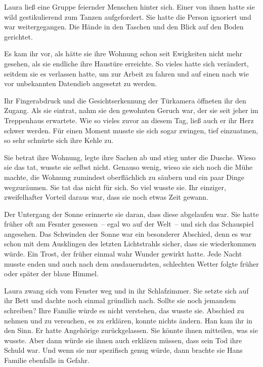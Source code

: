 Laura ließ eine Gruppe feiernder Menschen hinter sich. Einer von ihnen hatte sie wild gestikulierend zum Tanzen aufgefordert. Sie hatte die Person ignoriert und war weitergegangen. Die Hände in den Taschen und den Blick auf den Boden gerichtet.

\par

Es kam ihr vor, als hätte sie ihre Wohnung schon seit Ewigkeiten nicht mehr gesehen, als sie endliche ihre Haustüre erreichte. So vieles hatte sich verändert, seitdem sie es verlassen hatte, um zur Arbeit zu fahren und auf einen nach wie vor unbekannten Datendieb angesetzt zu werden.

\par

Ihr Fingerabdruck und die Gesichtserkennung der Türkamera öffneten ihr den Zugang. Als sie eintrat, nahm sie den gewohnten Geruch war, der sie seit jeher im Treppenhaus erwartete. Wie so vieles zuvor an diesem Tag, ließ auch er ihr Herz schwer werden. Für einen Moment musste sie sich sogar zwingen, tief einzuatmen, so sehr schnürte sich ihre Kehle zu.

\par

Sie betrat ihre Wohnung, legte ihre Sachen ab und stieg unter die Dusche. Wieso sie das tat, wusste sie selbst nicht. Genauso wenig, wieso sie sich noch die Mühe machte, die Wohnung zumindest oberflächlich zu säubern und ein paar Dinge wegzuräumen. Sie tat das nicht für sich. So viel wusste sie. Ihr einziger, zweifelhafter Vorteil daraus war, dass sie noch etwas Zeit gewann.

\par

Der Untergang der Sonne erinnerte sie daran, dass diese abgelaufen war. Sie hatte früher oft am Fesnter gesessen~-- egal wo auf der Welt~-- und sich das Schauspiel angesehen. Das Schwinden der Sonne war ein besonderer Abschied, denn es war schon mit dem Ausklingen des letzten Lichtstrahls sicher, dass sie wiederkommen würde. Ein Trost, der früher einmal wahr Wunder gewirkt hatte. Jede Nacht musste enden und auch nach dem ausdauerndsten, schlechten Wetter folgte früher oder später der blaue Himmel.

\par

Laura zwang sich vom Fenster weg und in ihr Schlafzimmer. Sie setzte sich auf ihr Bett und dachte noch einmal gründlich nach. Sollte sie noch jemandem schreiben? Ihre Familie würde es nicht verstehen, das wusste sie. Abschied zu nehmen und zu versuchen, es zu erklären, konnte nichts ändern. Han kam ihr in den Sinn. Er hatte Angehörige zurückgelassen. Sie könnte ihnen mitteilen, was sie wusste. Aber dann würde sie ihnen auch erklären müssen, dass sein Tod ihre Schuld war. Und wenn sie nur spezifisch genug würde, dann brachte sie Hans Familie ebenfalls in Gefahr.

